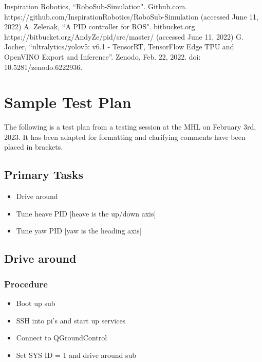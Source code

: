 \documentclass[conference]{IEEEtran}
\begin{document}
\begin{thebibliography}{00}
 Inspiration Robotics, ``RoboSub-Simulation". Github.com. https://github.com/InspirationRobotics/RoboSub-Simulation (accessed June 11, 2022)
 A. Zelenak, ``A PID controller for ROS". bitbucket.org. https://bitbucket.org/AndyZe/pid/src/master/ (accessed June 11, 2022)
 G. Jocher, ``ultralytics/yolov5: v6.1 - TensorRT, TensorFlow Edge TPU and OpenVINO Export and Inference”. Zenodo, Feb. 22, 2022. doi: 10.5281/zenodo.6222936.

\end{thebibliography}

\clearpage
\appendices
\section{Sample Test Plan}
The following is a test plan from a testing session at the MHL on February 3rd, 2023. It has been adapted for formatting and clarifying comments have been placed in brackets. \\

\subsection{Primary Tasks}
\begin{itemize}
    \item Drive around
    \item Tune heave PID [heave is the up/down axis]
    \item Tune yaw PID [yaw is the heading axis]
\end{itemize}

\subsection{Drive around}
\subsubsection{Procedure}
\begin{itemize}
    \item Boot up sub
    \item SSH into pi’s and start up services
    \item Connect to QGroundControl
    \item Set SYS ID = 1 and drive around sub
\end{itemize}
\end{document}
